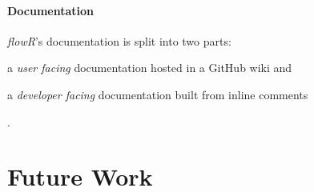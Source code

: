 \documentclass[color,coloraccent=red!60!black,listings]{poster}
\def\flowr{\textit{flowR}}
\begin{document}
\begin{multicols}{3}
	\paragraph{Documentation} \flowr's documentation is split into two parts:
	\begin{enumerate*}
		\item a \emph{user facing} documentation hosted in a GitHub wiki and
		\item a \emph{developer facing} documentation built from inline comments
	\end{enumerate*}. %
	\section*{Future Work}
	\lipsum[2]
\end{multicols}
\end{document}
